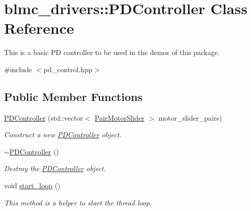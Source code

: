 \hypertarget{classblmc__drivers_1_1PDController}{}\section{blmc\+\_\+drivers\+:\+:P\+D\+Controller Class Reference}
\label{classblmc__drivers_1_1PDController}


This is a basic PD controller to be used in the demos of this package.  




{\ttfamily \#include $<$pd\+\_\+control.\+hpp$>$}

\subsection*{Public Member Functions}
\begin{DoxyCompactItemize}
\item 
\hyperlink{classblmc__drivers_1_1PDController_a78e3d01f6bcc263b20b81a7525d072cf}{P\+D\+Controller} (std\+::vector$<$ \hyperlink{namespaceblmc__drivers_a134270c90d29a9a28b64ab0e5f7158f7}{Pair\+Motor\+Slider} $>$ motor\+\_\+slider\+\_\+pairs)
\begin{DoxyCompactList}\small\item\em Construct a new \hyperlink{classblmc__drivers_1_1PDController}{P\+D\+Controller} object. \end{DoxyCompactList}\item 
\mbox{\label{classblmc__drivers_1_1PDController_aed8ffc7914eb5976f95936315bcd9c47}} 
\hyperlink{classblmc__drivers_1_1PDController_aed8ffc7914eb5976f95936315bcd9c47}{$\sim$\+P\+D\+Controller} ()
\begin{DoxyCompactList}\small\item\em Destroy the \hyperlink{classblmc__drivers_1_1PDController}{P\+D\+Controller} object. \end{DoxyCompactList}\item 
\mbox{\label{classblmc__drivers_1_1PDController_a9c9258e9f1af0f4ca00d2ede682ad511}} 
void \hyperlink{classblmc__drivers_1_1PDController_a9c9258e9f1af0f4ca00d2ede682ad511}{start\+\_\+loop} ()
\begin{DoxyCompactList}\small\item\em This method is a helper to start the thread loop. \end{DoxyCompactList}\end{DoxyCompactItemize}

